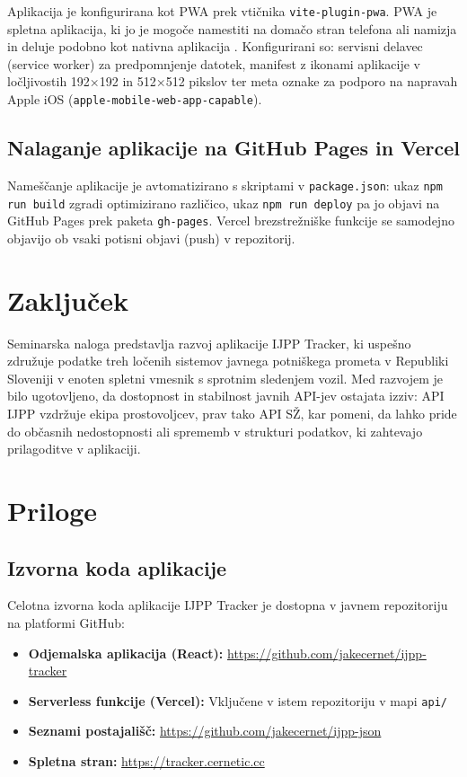 \documentclass[12pt]{article}
\begin{document}
Aplikacija je konfigurirana kot PWA prek vtičnika \texttt{vite-plugin-pwa}. PWA je spletna aplikacija, ki jo je mogoče namestiti na domačo stran telefona ali namizja in deluje podobno kot nativna aplikacija \cite{pwa}. Konfigurirani so: servisni delavec (service worker) za predpomnjenje datotek, manifest z ikonami aplikacije v ločljivostih 192×192 in 512×512 pikslov ter meta oznake za podporo na napravah Apple iOS (\texttt{apple-mobile-web-app-capable}).

\subsection{Nalaganje aplikacije na GitHub Pages in Vercel}

Nameščanje aplikacije je avtomatizirano s skriptami v \texttt{package.json}: ukaz \texttt{npm run build} zgradi optimizirano različico, ukaz \texttt{npm run deploy} pa jo objavi na GitHub Pages prek paketa \texttt{gh-pages}. Vercel brezstrežniške funkcije se samodejno objavijo ob vsaki potisni objavi (push) v repozitorij.

\section{Zaključek}

Seminarska naloga predstavlja razvoj aplikacije IJPP Tracker, ki uspešno združuje podatke treh ločenih sistemov javnega potniškega prometa v Republiki Sloveniji v enoten spletni vmesnik s sprotnim sledenjem vozil. Med razvojem je bilo ugotovljeno, da dostopnost in stabilnost javnih API-jev ostajata izziv: API IJPP vzdržuje ekipa prostovoljcev, prav tako API SŽ, kar pomeni, da lahko pride do občasnih nedostopnosti ali sprememb v strukturi podatkov, ki zahtevajo prilagoditve v aplikaciji. 

\newpage
\begingroup
\makeatletter
\section{Priloge}
\makeatother

\subsection{Izvorna koda aplikacije}

Celotna izvorna koda aplikacije IJPP Tracker je dostopna v javnem repozitoriju na platformi GitHub:

\begin{itemize}
\item \textbf{Odjemalska aplikacija (React):} \url{https://github.com/jakecernet/ijpp-tracker}
\item \textbf{Serverless funkcije (Vercel):} Vključene v istem repozitoriju v mapi \texttt{api/}
\item \textbf{Seznami postajališč:} \url{https://github.com/jakecernet/ijpp-json}
\item \textbf{Spletna stran:} \url{https://tracker.cernetic.cc}
\end{itemize}
\end{document}
